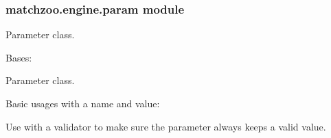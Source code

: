 \documentclass[letterpaper,10pt,english]{sphinxmanual}
\begin{document}
\subsubsection{matchzoo.engine.param module}
\label{\detokenize{matchzoo.engine:matchzoo-engine-param-module}}\label{\detokenize{matchzoo.engine:module-matchzoo.engine.param}}
Parameter class.

\begin{fulllineitems}
\label{\detokenize{matchzoo.engine:matchzoo.engine.param.Param}}
Bases: 

Parameter class.

Basic usages with a name and  value:

%
\begin{sphinxVerbatim}[commandchars=\\\{\}]
   
\end{sphinxVerbatim}

Use with a validator to make sure the parameter always keeps a valid
value.


\end{fulllineitems}
\end{document}
